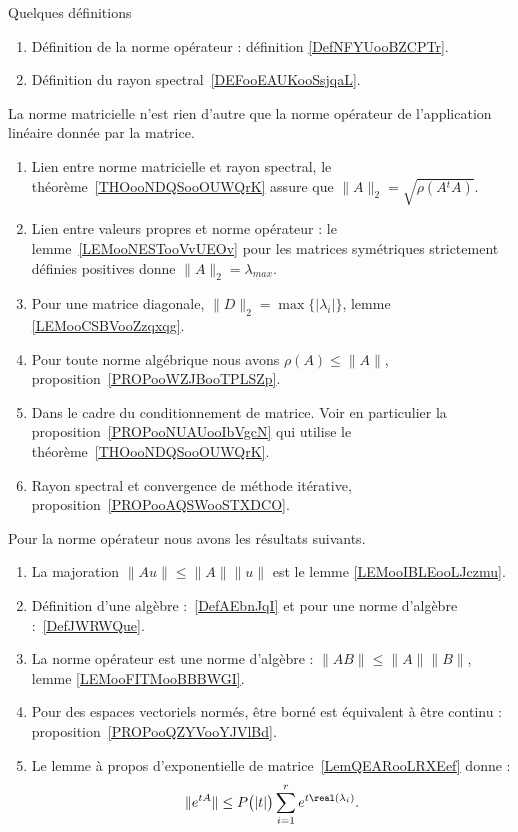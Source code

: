      \label{THEMEooOJJFooWMSAtL}

Quelques définitions
\begin{enumerate}
	\item
	      Définition de la norme opérateur : définition \ref{DefNFYUooBZCPTr}.
	\item
	      Définition du rayon spectral~\ref{DEFooEAUKooSsjqaL}.
\end{enumerate}

La norme matricielle n'est rien d'autre que la norme opérateur de l'application linéaire donnée par la matrice.

\begin{enumerate}
	\item
	      Lien entre norme matricielle et rayon spectral, le théorème~\ref{THOooNDQSooOUWQrK} assure que \( \|A\|_2=\sqrt{\rho(A{^t}A)}\).
	\item
	      Lien entre valeurs propres et norme opérateur : le lemme~\ref{LEMooNESTooVvUEOv} pour les matrices symétriques strictement définies positives donne \( \| A \|_2=\lambda_{max}\).
	\item
	      Pour une matrice diagonale, \( \| D \|_2=\max\{ | \lambda_i | \}\), lemme \ref{LEMooCSBVooZzqxqg}.
	\item
	      Pour toute norme algébrique nous avons \( \rho(A)\leq \| A \|\), proposition~\ref{PROPooWZJBooTPLSZp}.
	\item
	      Dans le cadre du conditionnement de matrice. Voir en particulier la proposition~\ref{PROPooNUAUooIbVgcN} qui utilise le théorème~\ref{THOooNDQSooOUWQrK}.
	\item
	      Rayon spectral et convergence de méthode itérative, proposition~\ref{PROPooAQSWooSTXDCO}.
\end{enumerate}

Pour la norme opérateur nous avons les résultats suivants.

\begin{enumerate}
	\item
	      La majoration \( \| Au \|\leq \| A \|\| u \|\) est le lemme \ref{LEMooIBLEooLJczmu}.
	\item
	      Définition d'une algèbre :~\ref{DefAEbnJqI} et pour une norme d'algèbre :~\ref{DefJWRWQue}.
	\item
	      La norme opérateur est une norme d'algèbre : \( \| AB \|\leq \| A \|\| B \|\), lemme \ref{LEMooFITMooBBBWGI}.
	\item
	      Pour des espaces vectoriels normés, être borné est équivalent à être continu : proposition~\ref{PROPooQZYVooYJVlBd}.
	\item
	      Le lemme à propos d'exponentielle de matrice~\ref{LemQEARooLRXEef} donne :
	      \begin{equation*}
		      \|  e^{tA} \|\leq P\big( | t | \big)\sum_{i=1}^r e^{t\real(\lambda_i)}.
	      \end{equation*}
\end{enumerate}

